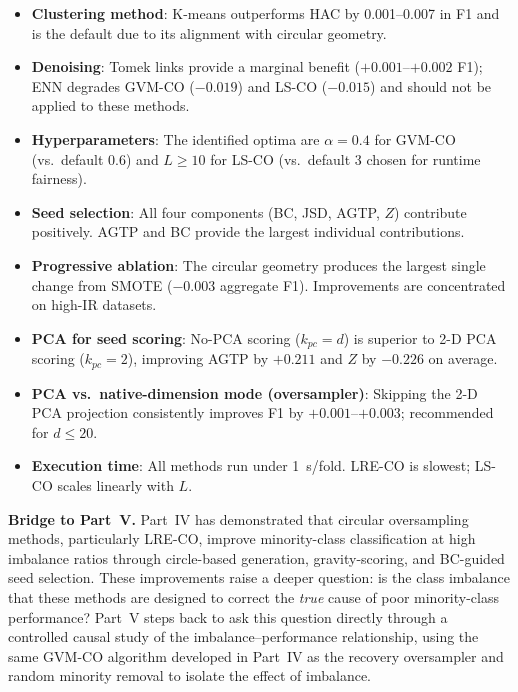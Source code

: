\begin{itemize}[leftmargin=*]
    \item \textbf{Clustering method}: K-means outperforms HAC by 0.001--0.007 in F1 and is the default due to its alignment with circular geometry.
    \item \textbf{Denoising}: Tomek links provide a marginal benefit ($+0.001$--$+0.002$ F1); ENN degrades GVM-CO ($-0.019$) and LS-CO ($-0.015$) and should not be applied to these methods.
    \item \textbf{Hyperparameters}: The identified optima are $\alpha=0.4$ for GVM-CO (vs.\ default 0.6) and $L \geq 10$ for LS-CO (vs.\ default 3 chosen for runtime fairness).
    \item \textbf{Seed selection}: All four components (BC, JSD, AGTP, $Z$) contribute positively. AGTP and BC provide the largest individual contributions.
    \item \textbf{Progressive ablation}: The circular geometry produces the largest single change from SMOTE ($-0.003$ aggregate F1). Improvements are concentrated on high-IR datasets.
    \item \textbf{PCA for seed scoring}: No-PCA scoring ($k_{pc}=d$) is superior to 2-D PCA scoring ($k_{pc}=2$), improving AGTP by $+0.211$ and $Z$ by $-0.226$ on average.
    \item \textbf{PCA vs.\ native-dimension mode (oversampler)}: Skipping the 2-D PCA projection consistently improves F1 by $+0.001$--$+0.003$; recommended for $d \leq 20$.
    \item \textbf{Execution time}: All methods run under 1~s/fold. LRE-CO is slowest; LS-CO scales linearly with $L$.
\end{itemize}

\medskip\noindent\textbf{Bridge to Part~V.}
Part~IV has demonstrated that circular oversampling methods, particularly LRE-CO, improve minority-class classification at high imbalance ratios through circle-based generation, gravity-scoring, and BC-guided seed selection.
These improvements raise a deeper question: is the class imbalance that these methods are designed to correct the \emph{true} cause of poor minority-class performance?
Part~V steps back to ask this question directly through a controlled causal study of the imbalance--performance relationship, using the same GVM-CO algorithm developed in Part~IV as the recovery oversampler and random minority removal to isolate the effect of imbalance.
